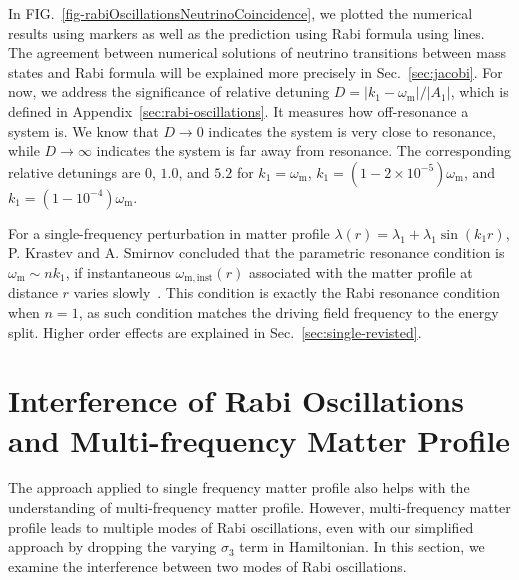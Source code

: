 \documentclass[%
reprint,
 amsmath,amssymb,
 prd,
]{revtex4-1}
\newcommand{\RD}{D}
\begin{document}
In FIG.~\ref{fig-rabiOscillationsNeutrinoCoincidence}, we plotted the numerical results using markers as well as the prediction using Rabi formula using lines. The agreement between numerical solutions of neutrino transitions between mass states and Rabi formula will be explained more precisely in Sec.~\ref{sec:jacobi}. For now, we address the significance of relative detuning $\RD = \lvert k_1 - \omega_{\mathrm m} \rvert /\lvert A_1 \rvert$,  which is defined in Appendix~\ref{sec:rabi-oscillations}. It measures how off-resonance a system is. We know that $\RD\to 0$ indicates the system is very close to resonance, while $\RD\to \infty$ indicates the system is far away from resonance. The corresponding relative detunings are $0$, $1.0$, and $5.2$ for $k_1=\omega_{\mathrm{m}}$, $k_1=(1-2\times 10^{-5})\omega_{\mathrm m}$, and $k_1=(1-10^{-4})\omega_{\mathrm m}$.


For a single-frequency perturbation in matter profile $\lambda(r) =\lambda_1 +  \lambda_1\sin(k_1 r)$, P. Krastev and A. Smirnov concluded that the parametric resonance condition is $\omega_{\mathrm{m}} \sim n k_1$, if instantaneous $\omega_{\mathrm{m,inst}}(r)$ associated with the matter profile at distance $r$ varies slowly~\cite{Krastev1989}. This condition is exactly the Rabi resonance condition when $n=1$, as such condition matches the driving field frequency to the energy split. Higher order effects are explained in Sec.~\ref{sec:single-revisted}.





\section{\label{sec:multiple}Interference of Rabi Oscillations and Multi-frequency Matter Profile}


The approach applied to single frequency matter profile also helps with the understanding of multi-frequency matter profile. However, multi-frequency matter profile leads to multiple modes of Rabi oscillations, even with our simplified approach by dropping the varying $\sigma_3$ term in Hamiltonian. In this section, we examine the interference between two modes of Rabi oscillations.



\end{document}
